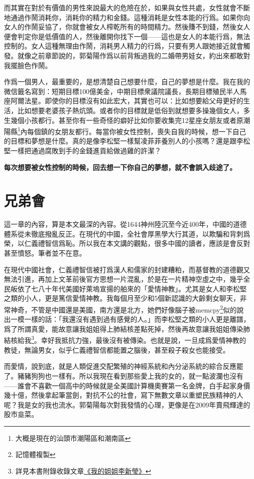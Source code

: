 而其實在對於有價值的男性來說最大的危險在於，如果與女性共處，女性就會不斷地通過作鬧消耗你，消耗你的精力和金錢。這種消耗是女性本能的行爲。如果你向女人的作鬧妥協了，你就會被女人榨乾所有的時間精力。然後賺不到錢，然後女人便會判定你是低價值的人，然後離開你找下一個——這也是女人的本能行爲，無法控制的。女人這種無理由作鬧，消耗男人精力的行爲，只要有男人跟她接近就會觸發。就像之前章節說的，郭菊陽作爲以前背叛過我的二婚帶男娃女，約出來都敢對我擺臉色作鬧。

作爲一個男人，最重要的，是想清楚自己想要什麼，自己的夢想是什麼。我在我的微信籤名寫到：短期目標100億美金，中期目標衆議院議長，長期目標殖民半人馬座阿爾法星。即使你的目標沒有如此宏大，其實也可以：比如想要給父母更好的生活，比如想要老婆孩子熱炕頭。或者你的目標就是低俗到就想要多操幾個女人，多生幾個小孩都行。甚至你有一些奇怪的癖好比如你要收集完12星座女朋友或者原潮陽縣\footnote{大概是現在的汕頭市潮陽區和潮南區}內每個鎮的女朋友都行。每當你被女性控制，喪失自我的時候，想一下自己的目標和夢想是什麼。真的是像李松堅一樣幫凌菲菲養別人的小孩嗎？還是跟李松堅一樣把通過腐敗到手的金錢進貢給做過雞的許潔？

\textbf{每次想要被女性控制的時候，回去想一下你自己的夢想，就不會誤入歧途了。}

\section{兄弟會}

這一章的內容，算是本文最深的內容。從1644神州陸沉至今近400年，中國的道德體系從未徹底撥亂反正。在現代的中國，全社會厚黑學大行其道，以欺騙和背刺爲榮，以仁義禮智信爲恥。所以我在本文講的觀點，很多中國的讀者，應該是會反對甚至憤怒。筆者並不在意。

在現代中國社會，仁義禮智信被打爲漢人和儒家的封建糟粕，而基督教的道德觀又無法引進，再加上文革前後官方思想一片混亂，於是在一片精神空虛之中，幾乎全民皈依了七八十年代美國好萊塢宣揚的舶來的「愛情神教」。尤其是女人和李松堅之類的小人，更是篤信愛情神教。我每個月至少和5個新認識的大齡剩女聊天，非常神奇，不管是中國還是美國，南方還是北方，她們好像腦子被memcpy\footnote{記憶體複製}似的說出一模一樣的話：「我還沒有遇到過有感覺的人。」而李松堅之類的小人更是離譜，爲了所謂真愛，能故意讓我姐姐得上肺結核差點死掉，然後再故意讓我姐姐傳染肺結核給我\footnote{詳見本書附錄收錄文章\hyperref[sister]{《我的姐姐李新瑩》}}。幸好我抵抗力強，最後沒有被傳染。也就是說，一旦成爲愛情神教的教徒，無論男女，似乎仁義禮智信都能置之腦後，甚至殺子殺女也能接受。

而愛情，說到底，就是人類促進交配繁殖的神經系統和內分泌系統的綜合反應罷了。豬豬狗狗也一樣有。所以我現在看到那些愛上我的女的，就一點波瀾也沒有——誰會不喜歡一個高中的時候就是全美國計算機奧賽第一名金牌，白手起家身價幾十億，然後拿起筆當劍，對抗不公的社會，寫下無數文章以重塑民族精神的人呢？我是女的我也流水。郭菊陽每次對我發情的心理，更像是在2009年賣飛輝達的股市韭菜。

